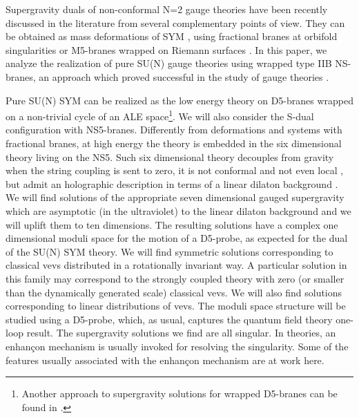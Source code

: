 \documentclass[a4paper,12pt]{article}
\begin{document}
Supergravity duals of non-conformal
N=2 gauge theories have been recently discussed in the literature from 
several complementary points of view. They can be obtained as mass deformations
of \coordHE{} SYM \cite{pw,sfetsos,bpp,michela}, using fractional branes
at orbifold singularities \cite{kn,pg,bertolini,pproc,a,russo,billo}
or M5-branes wrapped on Riemann surfaces \cite{fayya}.
In this paper, we analyze the realization of pure SU(N) \coordHE{}
gauge theories using  wrapped type IIB NS-branes, an approach which
proved successful in the study of \coordHE{} gauge theories \cite{mn1,mn2}.

Pure SU(N) \coordHE{} SYM can be realized as the low energy theory
on D5-branes wrapped on
a non-trivial cycle of an ALE space\footnote{Another approach to
supergravity solutions for wrapped D5-branes can be found in
\cite{rajaraman}.}. We will also consider the
S-dual configuration with NS5-branes. 
Differently from \coordHE{}
deformations and systems with fractional branes, at high energy
the \coordHE{} theory is embedded in the six dimensional theory living
on the NS5. Such six dimensional theory decouples from gravity 
when the string coupling
is sent to zero, it is not conformal and not even
local \cite{seiberg}, but admit an holographic description in terms
of a linear dilaton background \cite{little}. 
We will find \coordHE{} solutions of
the appropriate seven dimensional gauged supergravity 
which are asymptotic (in the ultraviolet)
to the linear dilaton background and we will uplift them 
to ten dimensions. 
The resulting solutions have a complex one dimensional
moduli space for the motion of a D5-probe, as expected for the dual
of the SU(N) \coordHE{} SYM theory. We will find symmetric 
solutions corresponding to classical vevs
distributed in a rotationally invariant way. A particular solution in this
family may correspond to the strongly coupled theory with zero
(or smaller than the dynamically generated scale) classical vevs.
We will also find solutions corresponding to linear distributions 
of vevs. 
The moduli space structure
will be studied using a D5-probe, which, as usual, captures the 
quantum field theory one-loop result. 
The supergravity solutions we find are all singular.
In \coordHE{} theories, an enhan\c con mechanism 
\cite{jpp} is usually invoked for resolving the singularity.
Some of the 
 features usually associated with the enhan\c con mechanism are 
at work here.    
\end{document}
